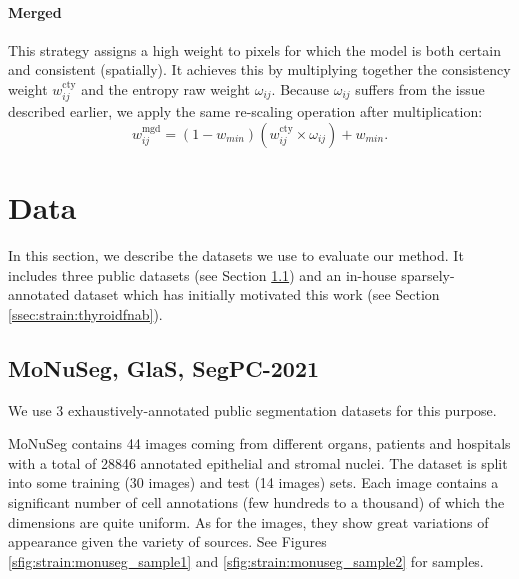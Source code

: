 
\paragraph{Merged} This strategy assigns a high weight to pixels for which the model is both certain and consistent (spatially). It achieves this by multiplying together the consistency weight $w^{\text{cty}}_{ij}$ and the entropy raw weight $\omega_{ij}$. Because $\omega_{ij}$ suffers from the issue described earlier, we apply the same re-scaling operation after multiplication:
\begin{equation}
w^{\text{mgd}}_{ij} = (1 - w_{min}) \left(w^{\text{cty}}_{ij} \times \omega_{ij}\right) + w_{min}.
\end{equation}


\section{Data}
\label{sec:strain:data}
In this section, we describe the datasets we use to evaluate our method. It includes three public datasets (see Section \ref{ssec:strain:datapublicdatasets}) and an in-house sparsely-annotated dataset which has initially motivated this work (see Section \ref{ssec:strain:thyroidfnab}). 

\subsection{MoNuSeg, GlaS, SegPC-2021}
\label{ssec:strain:datapublicdatasets}
We use 3 exhaustively-annotated public segmentation datasets for this purpose.

MoNuSeg \parencite{kumar2019multi} contains 44 images coming from different organs, patients and hospitals with a total of 28846 annotated epithelial and stromal nuclei. The dataset is split into some training (30 images) and test (14 images) sets. Each image contains a significant number of cell annotations (few hundreds to a thousand) of which the dimensions are quite uniform. As for the images, they show great variations of appearance given the variety of sources. See Figures \ref{sfig:strain:monuseg_sample1} and 
\ref{sfig:strain:monuseg_sample2} for samples.

